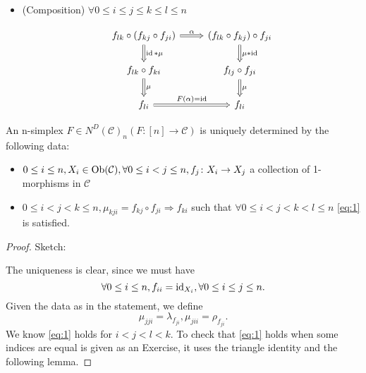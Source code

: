 \begin{rmk}
\begin{itemize}
		\item 
		(Composition)
		$ \forall 0 \leq i \leq j \leq k \leq l \leq n $
		
		\begin{equation}
		\label{eq:1}
		\begin{tikzcd}
			f_{lk} \circ ( f_{kj} \circ f_{ji} )
			\ar[r, Rightarrow, "\alpha"]
			\ar[d, Rightarrow, " \id * \mu"]
			&
			( f_{lk} \circ f_{kj} ) \circ f_{ji}
			\ar[d, Rightarrow, "\mu*\id"]
			\\
			f_{lk} \circ f_{ki}
			\ar[d, Rightarrow," \mu "]
			&
			f_{lj} \circ f_{ji}
			\ar[d, Rightarrow, " \mu "]
			\\
			f_{li}
			\ar[r, Rightarrow, " F ( \alpha ) = \id "]
			&
			f_{li}
		\end{tikzcd}
		\end{equation}
	\end{itemize}
\end{rmk}

\begin{prop}
	An n-simplex $ F \in N^D ( \mathcal{ C } )_n ( F \colon [ n ] \to \mathcal{ C } ) $ is uniquely determined by the following data:
	\begin{itemize}
		\item 
		$ 0 \leq i \leq n , X_i \in \operatorname{Ob}( \mathcal{ C } ) , \forall  0 \leq  i < j \leq n, f_j \colon X_i \to X_j $ a collection of 1-morphisms in $ \mathcal{ C } $
		
		\item 
		$ 0 \leq i < j < k \leq n , \mu_{ k j i } = f_{ k j } \circ f_{ j i } \Rightarrow f_{ k i } $ such that $ \forall 0 \leq i < j < k < l \leq n $ \ref{eq:1} is satisfied.  
\end{itemize}
\end{prop}

\begin{proof}
	Sketch:
	
	The uniqueness is clear, since we must have 
	\[
		\forall 0 \leq i \leq n , f_{ i i } = \operatorname{id}_{ X_i }, \forall 0 \leq i \leq j \leq n.
	\]
	Given the data as in the statement, we define  
	\[
		\mu_{ j j i } = \lambda_{ f_{ j i } } , \mu_{ j i i } = \rho_{ f_{ j i } }.
	\]
	We know \ref{eq:1} holds for $ i < j < l < k $.
	To check that \ref{eq:1} holds when some indices are equal is given as an Exercise, it uses the triangle identity and the following lemma.
\end{proof}


